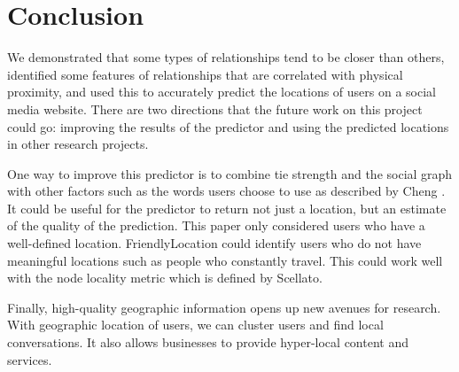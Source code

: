 \documentclass[letterpaper]{article}
\begin{document}
\section{Conclusion}

We demonstrated that some types of relationships tend to be closer than others,
identified some features of relationships that are correlated with physical
proximity, and used this to accurately predict the locations of users on a
social media website.
%
There are two directions that the future work on this project could go:
improving the results of the predictor and using the predicted locations in
other research projects.

One way to improve this predictor is to combine tie strength and the social
graph with other factors such as the words users choose to use as described by
Cheng \cite{cheng2010you}.
%
It could be useful for the predictor to return not just a location, but an
estimate of the quality of the prediction.
%
This paper only considered users who have a well-defined location.
%
FriendlyLocation could identify users who do not have meaningful locations such
as people who constantly travel.
%
This could work well with the node locality metric which is defined by
Scellato\cite{scellato2010distance}.

Finally, high-quality geographic information opens up new avenues for research.
With geographic location of users, we can cluster users and find local
conversations.
%
It also allows businesses to provide hyper-local content and services.
\end{document}
